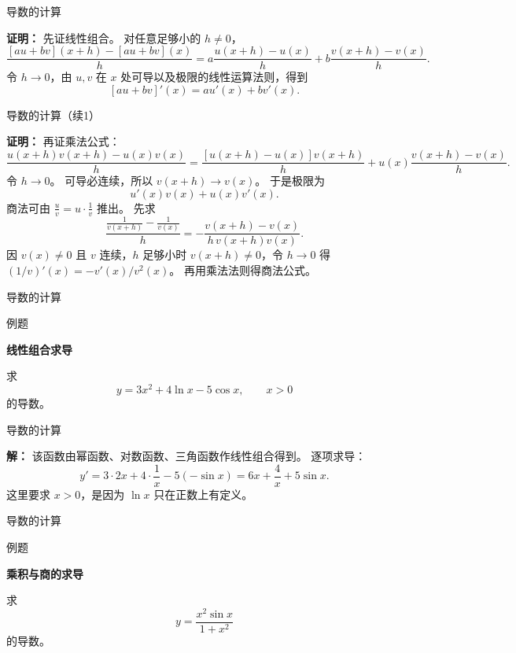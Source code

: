 \documentclass[aspectratio=169,10pt,fontset=fandol]{ctexbeamer}
\begin{document}
\begin{frame}[t,fragile]{导数的计算}
\footnotesize
{\footnotesize
\textbf{证明：}
先证线性组合。 对任意足够小的 $h\neq0$，
\[
\frac{[au+bv](x+h)-[au+bv](x)}{h}
=a\frac{u(x+h)-u(x)}{h}
+b\frac{v(x+h)-v(x)}{h}.
\]
令 $h\to0$，由 $u,v$ 在 $x$ 处可导以及极限的线性运算法则，得到
\[
[au+bv]'(x)=au'(x)+bv'(x).
\]


}
\end{frame}
\begin{frame}[t,fragile]{导数的计算（续1）}
\footnotesize
{\footnotesize
\textbf{证明：}
再证乘法公式：
\[
\frac{u(x+h)v(x+h)-u(x)v(x)}{h}
=\frac{[u(x+h)-u(x)]v(x+h)}{h}+u(x)\frac{v(x+h)-v(x)}{h}.
\]
令 $h\to0$。 可导必连续，所以 $v(x+h)\to v(x)$。 于是极限为
\[
u'(x)v(x)+u(x)v'(x).
\]
商法可由 $\frac{u}{v}=u\cdot\frac1v$ 推出。 先求
\[
\frac{\frac1{v(x+h)}-\frac1{v(x)}}{h}
=-\frac{v(x+h)-v(x)}{h\,v(x+h)v(x)}.
\]
因 $v(x)\neq0$ 且 $v$ 连续，$h$ 足够小时 $v(x+h)\neq0$，令 $h\to0$ 得 $(1/v)'(x)=-v'(x)/v^2(x)$。 再用乘法法则得商法公式。

}
\end{frame}
\begin{frame}[t,fragile]{导数的计算}
\footnotesize
\begin{block}{例题}
{\footnotesize
\textbf{线性组合求导}\par

求
\[
y=3x^2+4\ln x-5\cos x,\qquad x>0
\]
的导数。

}
\end{block}
\end{frame}
\begin{frame}[t,fragile]{导数的计算}
\footnotesize
{\footnotesize
\textbf{解：}
该函数由幂函数、对数函数、三角函数作线性组合得到。 逐项求导：
\[
y'=3\cdot 2x+4\cdot\frac1x-5(-\sin x)
=6x+\frac4x+5\sin x.
\]
这里要求 $x>0$，是因为 $\ln x$ 只在正数上有定义。

}
\end{frame}
\begin{frame}[t,fragile]{导数的计算}
\footnotesize
\begin{block}{例题}
{\footnotesize
\textbf{乘积与商的求导}\par

求
\[
y=\frac{x^2\sin x}{1+x^2}
\]
的导数。

}
\end{block}
\end{frame}
\end{document}
